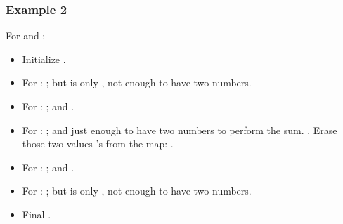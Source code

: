 \documentclass[letterpaper,12pt,english]{book}
\begin{document}
\subsubsection{Example 2}
\label{\detokenize{Counting/1679_Max_Number_of_K-Sum_Pairs:id1}}
\sphinxAtStartPar
For  and :
\begin{itemize}
\item {} 
\sphinxAtStartPar
Initialize .

\item {} 
\sphinxAtStartPar
For : ;  but  is only , not enough to have two numbers.

\item {} 
\sphinxAtStartPar
For : ;  and .

\item {} 
\sphinxAtStartPar
For : ;  and  just enough to have two numbers to perform the sum. . Erase those two values ’s from the map: .

\item {} 
\sphinxAtStartPar
For : ;  and .

\item {} 
\sphinxAtStartPar
For : ;  but  is only , not enough to have two numbers.

\item {} 
\sphinxAtStartPar
Final .

\end{itemize}
\end{document}
